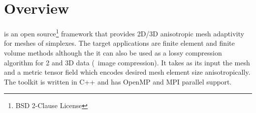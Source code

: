 \chapter*{Overview}
\pragmatic is an open source\footnote{BSD 2-Clause License} framework
that provides 2D/3D anisotropic mesh adaptivity for meshes of
simplexes. The target applications are finite element and finite
volume methods although the it can also be used as a lossy compression
algorithm for 2 and 3D data (\eg\ image compression). It takes as its
input the mesh and a metric tensor field which encodes desired mesh
element size anisotropically. The toolkit is written in C++ and has
OpenMP and MPI parallel support.
